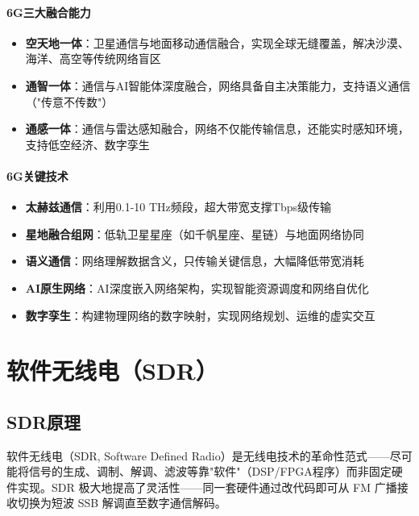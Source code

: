 \documentclass[12pt,UTF8]{ctexbook}
\begin{document}
\subsection{6G三大融合能力}
\begin{itemize}[leftmargin=2cm]
    \item \textbf{空天地一体}：卫星通信与地面移动通信融合，实现全球无缝覆盖，解决沙漠、海洋、高空等传统网络盲区
    \item \textbf{通智一体}：通信与AI智能体深度融合，网络具备自主决策能力，支持语义通信（"传意不传数"）
    \item \textbf{通感一体}：通信与雷达感知融合，网络不仅能传输信息，还能实时感知环境，支持低空经济、数字孪生
\end{itemize}

\subsection{6G关键技术}
\begin{itemize}[leftmargin=2cm]
    \item \textbf{太赫兹通信}：利用0.1-10 THz频段，超大带宽支撑Tbps级传输
    \item \textbf{星地融合组网}：低轨卫星星座（如千帆星座、星链）与地面网络协同
    \item \textbf{语义通信}：网络理解数据含义，只传输关键信息，大幅降低带宽消耗
    \item \textbf{AI原生网络}：AI深度嵌入网络架构，实现智能资源调度和网络自优化
    \item \textbf{数字孪生}：构建物理网络的数字映射，实现网络规划、运维的虚实交互
\end{itemize}


\part{软件无线电（SDR）}

\chapter{SDR原理}
\label{sec:sdr_principle}

软件无线电（SDR, Software Defined Radio）是无线电技术的革命性范式——尽可能将信号的生成、调制、解调、滤波等靠"软件"（DSP/FPGA程序）而非固定硬件实现。SDR 极大地提高了灵活性——同一套硬件通过改代码即可从 FM 广播接收切换为短波 SSB 解调直至数字通信解码。
\end{document}
